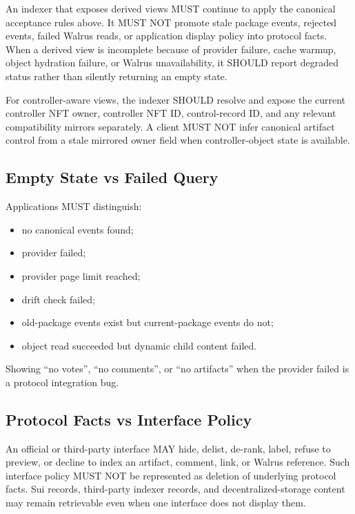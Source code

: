 \documentclass[11pt]{article}
\begin{document}
An indexer that exposes derived views MUST continue to apply the canonical
acceptance rules above. It MUST NOT promote stale package events, rejected
events, failed Walrus reads, or application display policy into protocol facts.
When a derived view is incomplete because of provider failure, cache warmup,
object hydration failure, or Walrus unavailability, it SHOULD report degraded
status rather than silently returning an empty state.

For controller-aware views, the indexer SHOULD resolve and expose the current
controller NFT owner, controller NFT ID, control-record ID, and any relevant
compatibility mirrors separately. A client MUST NOT infer canonical artifact
control from a stale mirrored owner field when controller-object state is
available.

\subsection{Empty State vs Failed Query}

Applications MUST distinguish:

\begin{itemize}[leftmargin=*]
  \item no canonical events found;
  \item provider failed;
  \item provider page limit reached;
  \item drift check failed;
  \item old-package events exist but current-package events do not;
  \item object read succeeded but dynamic child content failed.
\end{itemize}

Showing ``no votes'', ``no comments'', or ``no artifacts'' when the provider failed is a protocol integration bug.

\subsection{Protocol Facts vs Interface Policy}

An official or third-party interface MAY hide, delist, de-rank, label, refuse
to preview, or decline to index an artifact, comment, link, or Walrus
reference. Such interface policy MUST NOT be represented as deletion of
underlying protocol facts. Sui records, third-party indexer records, and
decentralized-storage content may remain retrievable even when one interface
does not display them.
\end{document}
